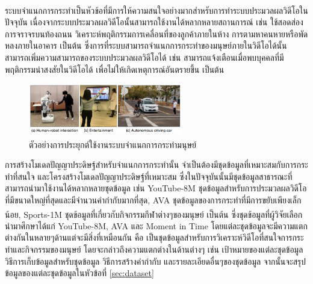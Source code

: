 ระบบจำแนกการกระทำ\textsuperscript{\cite{ma2017less}}เป็นหัวข้อที่มีการให้ความสนใจอย่างมากสำหรับการทำระบบประมวลผลวิดีโอในปัจจุบัน เนื่องจากระบบประมวลผลวิดีโอนั้นสามารถใช้งานได้หลากหลายสถานการณ์ เช่น ใช้สอดส่องการจราจรบนท้องถนน
วิเคราะห์พฤติกรรมการเคลื่อนที่ของลูกค้าภายในห้าง การตามหาคนหายหรือพัดหลงภายในอาคาร เป็นต้น ซึ่งการที่ระบบสามารถจำแนกการกระทำของมนุษย์ภายในวิดีโอได้นั้นสามารถเพิ่มความสามารถของระบบประมวลผลวิดีโอได้
เช่น สามารถแจ้งเตือนเมื่อพบบุคคลที่มีพฤติกรรมน่าสงสัยในวิดีโอได้ เพื่อไม่ให้เกิดเหตุการณ์อันตรายขึ้น เป็นต้น

\begin{figure}[!ht]
	\centering
	\includegraphics[width=0.6\textwidth]{chapter2/images/video_analytics_ex.png}
	\caption{ตัวอย่างการประยุกต์ใช้งานระบบจำแนกการกระทำมนุษย์\textsuperscript{\cite{kong2018human}}}
	\label{fig:actioncls_ex}
\end{figure}

การสร้างโมเดลปัญญาประดิษฐ์สำหรับจำแนกการกระทำนั้น จำเป็นต้องมีชุดข้อมูลที่เหมาะสมกับการกระทำที่สนใจ และโครงสร้างโมเดลปัญญาประดิษฐ์ที่เหมาะสม
ซึ่งในปัจจุบันนั้นมีชุดข้อมูลสาธารณะที่สามารถนำมาใช้งานได้หลากหลายชุดข้อมูล เช่น YouTube-8M ชุดข้อมูลสำหรับการประมวลผลวิดีโอที่มีขนาดใหญ่ที่สุดและมีจำนวนคำกำกับมากที่สุด, 
AVA ชุดข้อมูลของการกระทำที่มีการขยับเพียงเล็กน้อย, Sports-1M\textsuperscript{\cite{karpathy2014large}} ชุดข้อมูลที่เกี่ยวกับกิจกรรมกีฬาต่างๆของมนุษย์ เป็นต้น ซึ่งชุดข้อมูลที่ผู้วิจัยเลือกนำมาศึกษาได้แก่ YouTube-8M, AVA และ Moment in Time
โดยแต่ละชุดข้อมูลจะมีความแตกต่างกันในหลายๆด้านแต่จะมีสิ่งที่เหมือนกัน คือ เป็นชุดข้อมูลสำหรับการวิเคราะห์วิดีโอที่สนใจการกระทำและกิจกรรมของมนุษย์ โดยจะกล่าวถึงความแตกต่างในด้านต่างๆ 
เช่น เป้าหมายของแต่ละชุดข้อมูล วิธีการเก็บข้อมูลสำหรับชุดข้อมูล วิธีการสร้างคำกำกับ และรายละเอียดอื่นๆของชุดข้อมูล จากนั้นจะสรุปข้อมูลของแต่ละชุดข้อมูลในหัวข้อที่ \ref{sec:dataset}